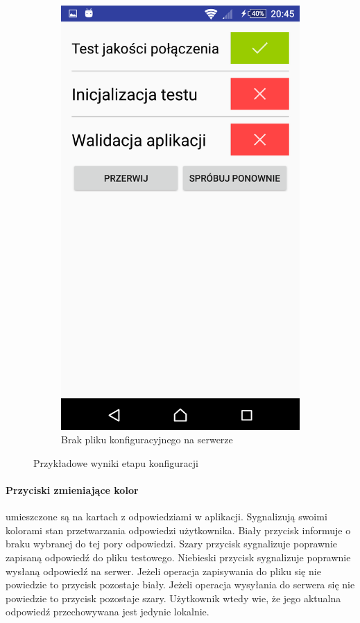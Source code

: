 \documentclass[eng]{mgr}
\begin{document}
\begin{figure}[ht]
\begin{subfigure}{.32\textwidth}
						\includegraphics[width=.9\linewidth]{walidacja_brak_pliku_konfiguracyjnego.png}
						\caption{Brak pliku konfiguracyjnego na serwerze}
						\label{fig:walidacja_brak_pliku}
					\end{subfigure}
					\caption{Przykładowe wyniki etapu konfiguracji}
					\label{fig:wyglad_aplikacji_3}
				\end{figure}
				
				\paragraph{Przyciski zmieniające kolor}
				umieszczone są na kartach z odpowiedziami w aplikacji. Sygnalizują swoimi kolorami stan przetwarzania odpowiedzi użytkownika. Biały przycisk informuje o braku wybranej do tej pory odpowiedzi. Szary przycisk sygnalizuje poprawnie zapisaną odpowiedź do pliku testowego. Niebieski przycisk sygnalizuje poprawnie wysłaną odpowiedź na serwer.
				Jeżeli operacja zapisywania do pliku się nie powiedzie to przycisk pozostaje biały.
				Jeżeli operacja wysyłania do serwera się nie powiedzie to przycisk pozostaje szary. Użytkownik wtedy wie, że jego aktualna odpowiedź przechowywana jest jedynie lokalnie.\\
				
\end{document}
